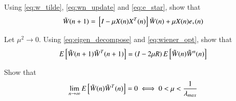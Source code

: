 \documentclass[journal,12pt,twocolumn]{IEEEtran}
\begin{document}
\begin{problem}
Using \eqref{eq:w_tilde}, \eqref{eq:wn_update} and \eqref{eq:e_star},  show that 
\begin{equation}
\tilde W(n+1) = {}\left[I - \mu X(n) X^{T}(n) \right]\tilde W(n) + \mu X(n)e_{*}(n)
\end{equation}
\begin{problem}
Let $\mu^2 \to 0$.  Using \eqref{eq:eigen_decompose} and \eqref{eq:wiener_opt}, show that
\begin{equation}
E{}\left[\tilde W(n+1)\tilde W^{T}(n+1)\right] = \left(I - 2\mu R\right)E{}\left[\tilde W(n)\tilde W^{n}(n)\right]
\end{equation}
\end{problem}
\end{problem}
%
\begin{problem}
Show that 
\begin{equation}
\lim_{n\to\infty}E{}\left[\tilde W(n)\tilde W^{T}(n)\right] = 0 \iff 0 < \mu < \dfrac{1}{\lambda_{max}}
\end{equation}
\end{problem}
\end{document}
